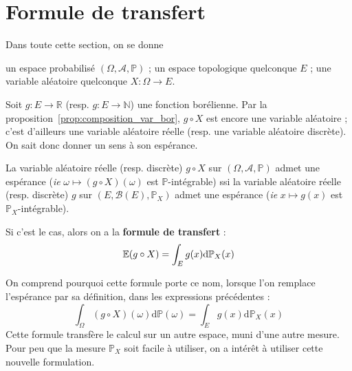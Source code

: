 \documentclass[../integ-proba.tex]{subfiles}
\begin{document}
    \section{Formule de transfert}

    Dans toute cette section, on se donne
    \begin{itemize}
        \itemb un espace probabilisé $\left(\Omega, \mathcal{A}, \mathbb{P}\right)$ ;
        \itemb un espace topologique quelconque $E$ ;
        \itemb une variable aléatoire quelconque $X:\Omega \longrightarrow E$.
    \end{itemize}

    \begin{thm}
        Soit $g:E \longrightarrow \mathbb{R}$ (resp. $g:E \longrightarrow \mathbb{N}$) une fonction borélienne.
        Par la proposition~\ref{prop:composition_var_bor}, $g \circ X$ est encore une variable aléatoire ;
        c'est d'ailleurs une variable aléatoire réelle (resp.
        une variable aléatoire discrète).
        On sait donc donner un sens à son espérance.

        La variable aléatoire réelle (resp.
        discrète) $g \circ X$ sur $\left(\Omega, \mathcal{A}, \mathbb{P}\right)$ admet une espérance (\textit{ie} $\omega \mapsto (g \circ X)(\omega)$ est $\mathbb{P}$-intégrable) ssi la variable aléatoire réelle (resp.
        discrète) $g$ sur $\left(E, \mathcal{B}(E), \mathbb{P}_X\right)$ admet une espérance (\textit{ie} $x \mapsto g(x)$ est $\mathbb{P}_X$-intégrable).

        Si c'est le cas, alors on a la \textbf{formule de transfert} :
        \begin{displaymath}
            \mathbb{E}(g \circ X) = \int_E g(x)\textnormal{d}\mathbb{P}_X(x)
        \end{displaymath}
    \end{thm}

    \begin{rem}
        On comprend pourquoi cette formule porte ce nom, lorsque l'on remplace l'espérance par sa définition, dans les expressions précédentes :
        \begin{displaymath}
            \int_\Omega (g \circ X)(\omega) \text{d} \mathbb{P}(\omega) = \int_E g(x) \text{d} \mathbb{P}_X(x)
        \end{displaymath}
        Cette formule transfère le calcul sur un autre espace, muni d'une autre mesure.
        Pour peu que la mesure $\mathbb{P}_X$ soit facile à utiliser, on a intérêt à utiliser cette nouvelle formulation.
    \end{rem}
\end{document}
